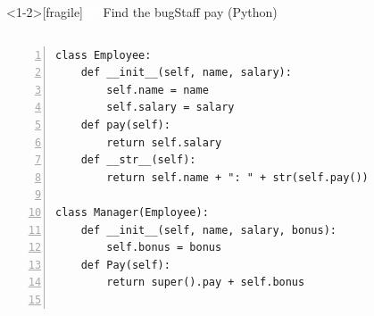\documentclass[aspectratio=169]{beamer}
\newcommand{\qb}[2]{\colorbox{bkblue}{\textcolor{white}{\normalsize\bfseries\sffamily Q#1}}\,{\normalsize\sffamily\textcolor{bkblue!75}{#2}}\enspace}
\begin{document}
\begin{frame}<1-2>[fragile]{\qb{7}{Find the bug}Staff pay (Python)}
  \begin{columns}[T,onlytextwidth]
\begin{lstlisting}[language=Py,style=bad,numbers=left,numberstyle=\tiny\color{codegray},numbersep=0.7em,basicstyle=\ttfamily\fontsize{6.8}{7.9}\selectfont]
class Employee:
    def __init__(self, name, salary):
        self.name = name
        self.salary = salary
    def pay(self):
        return self.salary
    def __str__(self):
        return self.name + ": " + str(self.pay())

class Manager(Employee):
    def __init__(self, name, salary, bonus):
        self.bonus = bonus
    def Pay(self):
        return super().pay + self.bonus


\end{lstlisting}
\end{columns}
\end{frame}
\end{document}

